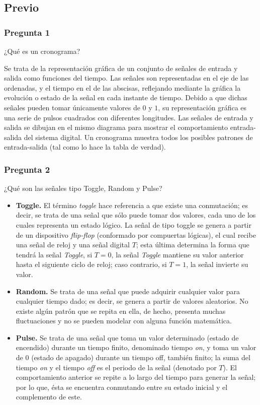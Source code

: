 \documentclass[../procedimientos.tex]{subfiles}
\begin{document}
\subsection{Previo}
\subsubsection*{Pregunta 1}
\begin{em}
  ¿Qué es un cronograma?
\end{em}
Se trata de la representación gráfica de un conjunto de señales de entrada y 
salida como funciones del tiempo. Las señales son representadas en el eje de 
las ordenadas, y el tiempo en el de las abscisas, reflejando mediante la 
gráfica la evolución o estado de la señal en cada instante de tiempo. Debido a 
que dichas señales pueden tomar únicamente valores de $0$ y $1$, su 
representación gráfica es una serie de pulsos cuadrados con diferentes 
longitudes. Las señales de entrada y salida se dibujan en el mismo diagrama 
para mostrar el comportamiento entrada-salida del sistema digital. Un 
cronograma muestra todos los posibles patrones de entrada-salida (tal como lo 
hace la tabla de verdad).

\subsubsection*{Pregunta 2}
\begin{em}
  ¿Qué son las señales tipo Toggle, Random y Pulse?
\end{em}
\begin{itemize}
  \item \textbf{Toggle.} El término \textit{toggle} hace referencia a que 
  existe una conmutación; es decir, se trata de una señal que sólo puede tomar 
    dos valores, cada uno de los cuales representa un estado lógico. La señal 
    de tipo toggle se genera a partir de un dispositivo \textit{flip-flop} 
    (conformado por compuertas lógicas), el cual recibe una señal de reloj y 
    una señal digital $T$; esta última determina la forma que tendrá la señal 
    \textit{Toggle}, si $T=0$, la señal \textit{Toggle} mantiene su valor 
    anterior hasta el siguiente ciclo de reloj; caso contrario, si $T=1$, la 
    señal invierte su valor.
  \item \textbf{Random.} Se trata de una señal que puede adquirir cualquier 
    valor para cualquier tiempo dado; es decir, se genera a partir de valores 
    aleatorios. No existe algún patrón que se repita en ella, de hecho, 
    presenta muchas fluctuaciones y no se pueden modelar con alguna función 
    matemática.
  \item \textbf{Pulse.} Se trata de una señal que toma un valor determinado 
    (estado de encendido) durante un tiempo finito, denominado tiempo 
    \textit{on}, y toma un valor de $0$ (estado de apagado) durante un tiempo 
    off, también finito; la suma del tiempo \textit{on} y el tiempo 
    \textit{off} es el periodo de la señal (denotado por $T$). El 
    comportamiento anterior se repite a lo largo del tiempo para generar la 
    señal; por lo que, ésta se encuentra conmutando entre su estado inicial y 
    el complemento de este.
\end{itemize}
\end{document}
